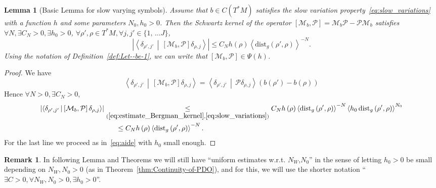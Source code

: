 \documentclass[10pt]{amsart}
\newtheorem{lemm}[theo]{Lemma}\newtheorem{prop}[theo]{Proposition}\newtheorem{coro}[theo]{Corollary}\newtheorem{conj}[theo]{Conjecture}
\theoremstyle{definition}\newtheorem{defi}[theo]{Definition}\newtheorem{rema}[theo]{Remark}\newtheorem{exam}[theo]{Example}\newtheorem{exem}[theo]{Example}\newtheorem{nota}[theo]{Notation}
\newcommand{\clM}{\mathcal{M}}
\newcommand{\clP}{\mathcal{P}}
\newcommand{\dist}{\mathrm{dist}}
\let\oldexists\exists
\renewcommand*{\exists}{\mathrel{\oldexists}}
\let\oldforall\forall
\renewcommand*{\forall}{\mathrel{\oldforall}}
\begin{document}
\begin{cBoxB}{}
\begin{lemm}[Basic Lemma for slow varying symbols]\label{lem:Basic_Lemma}
Assume that $b\in C(T^{*}M)$ satisfies the slow variation property~\eqref{eq:slow_variations} with a function $h$ and some parameters $N_{0},h_{0}>0$. Then the Schwartz kernel of the operator $[\clM_{b},\clP ]=\clM_{b}\clP -\clP \clM_{b}$ satisfies $\forall N,\exists C_{N}>0,\exists h_{0}>0$, $\forall\rho',\rho\in T^{*}M,\forall j,j'\in\{1,\,\ldots J\} $,
\begin{equation}\label{eq:commut_P}
\left|\left\langle\delta_{\rho',j'}\,\middle|\,\left[\clM_{b},\clP \right]\delta_{\rho,j}\right\rangle\right|\leq C_{N}h\left(\rho\right)\left\langle \dist_{g}\left(\rho',\rho\right)\right\rangle ^{-N}.
\end{equation}
Using the notation of Definition~\ref{def:Let--be-1}, we can write that $[\clM_{b},\clP ]\in\Psi(h)$.
\end{lemm}
\end{cBoxB}

\begin{proof}
We have
\[
\left\langle\delta_{\rho',j'}\,\middle|\,\left[\clM_{b},\clP \right]\delta_{\rho,j}\right\rangle=\left\langle\delta_{\rho',j'}\,\middle|\,\clP \delta_{\rho,j}\right\rangle\left(b\left(\rho'\right)-b\left(\rho\right)\right)
\]
Hence $\forall N>0,\exists C_{N}>0$,
\begin{align*}
\left|\left\langle\delta_{\rho',j'}\,\middle|\,\left[\clM_{b},\clP \right]\delta_{\rho,j}\right\rangle\right|&\underset{(\eqref{eq:estimate_Bergman_kernel},\eqref{eq:slow_variations})}{\leq}  C_{N}h\left(\rho\right)\left\langle \dist_{g}\left(\rho',\rho\right)\right\rangle ^{-N}\left\langle h_{0}\,\dist_{g}\left(\rho',\rho\right)\right\rangle ^{N_{0}}
\\
&\mkern30mu\leq  C_{N}h\left(\rho\right)\left\langle \dist_{g}\left(\rho',\rho\right)\right\rangle ^{-N}.
\end{align*}
For the last line we proceed as in~\eqref{eq:aide} with $h_{0}$ small enough.
\end{proof}

\begin{rema}
In following Lemma and Theorems we will still have ``uniform estimates w.r.t. $N_{W}$,$N_{0}$'' in the sense of letting $h_{0}>0$ be small depending on $N_{W},N_{0}>0$ (as in Theorem~\ref{thm:Continuity-of-PDO}), and for this, we will use the shorter notation ``$\exists C>0,\forall N_{W},N_{0}>0,\exists h_{0}>0$''.
\end{rema}
\end{document}
